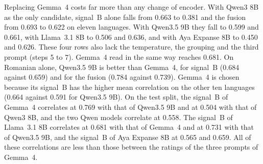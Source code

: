 Replacing Gemma~4 costs far more than any change of encoder. With Qwen3 8B as the only candidate,
signal~B alone falls from 0.663 to 0.381 and the fusion from 0.693 to 0.622 on eleven languages. %
With Qwen3.5 9B they fall to 0.599 and 0.661, with Llama~3.1 8B to 0.506 and 0.636, and with Aya %
Expanse 8B to 0.450 and 0.626. These four rows also lack the temperature, the grouping and the third
prompt (steps 5 to 7). Gemma~4 read in the same way reaches 0.681. On Romanian alone, %
Qwen3.5 9B is better than Gemma~4, for signal~B (0.684 against 0.659) and for the fusion (0.784 %
against 0.739). Gemma~4 is chosen because its signal~B has the higher mean correlation on the %
other ten languages (0.664 against 0.591 for Qwen3.5 9B). %
On the test split, the signal~B of Gemma~4 correlates at 0.769 with that of Qwen3.5 9B and at %
0.504 with that of Qwen3 8B, and the two Qwen models correlate at 0.558. The signal~B of Llama~3.1 8B %
correlates at 0.681 with that of Gemma~4 and at 0.731 with that of Qwen3.5 9B, and the signal~B of
Aya Expanse 8B at 0.565 and 0.659. All of these correlations are less than those between the ratings
of the three prompts of Gemma~4.

